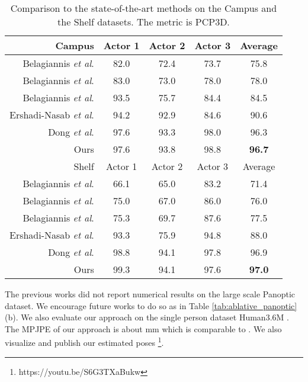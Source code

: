 \documentclass[runningheads]{llncs}
\def\etal{\emph{et al}. }
\begin{document}
\begin{table}[]
    \setlength{\tabcolsep}{10pt}
    \centering
    \begin{tabular}{r|cccc}
        \toprule
         Campus &  Actor 1 & Actor 2 & Actor 3 & Average \\
         \hline
         Belagiannis \etal \cite{belagiannis20143d} & 82.0 & 72.4 & 73.7 & 75.8\\
         Belagiannis \etal \cite{belagiannis2014multiple} & 83.0 & 73.0 & 78.0 & 78.0\\
         Belagiannis \etal \cite{belagiannis20153d} & 93.5 & 75.7 & 84.4 & 84.5\\
         Ershadi-Nasab \etal \cite{ershadi2018multiple} & 94.2 & 92.9 & 84.6 & 90.6\\
         Dong \etal \cite{dong2019fast} & 97.6 & 93.3 & 98.0 & 96.3\\
         Ours & 97.6 & 93.8 & 98.8 & \textbf{96.7} \\
         \hline
         \hline
          Shelf &  Actor 1 & Actor 2 & Actor 3 & Average \\
          \hline
          Belagiannis \etal \cite{belagiannis20143d} & 66.1 & 65.0 & 83.2 & 71.4\\
          Belagiannis \etal \cite{belagiannis2014multiple} & 75.0 & 67.0 & 86.0 & 76.0\\
          Belagiannis \etal \cite{belagiannis20153d} & 75.3 & 69.7 & 87.6 & 77.5\\
          Ershadi-Nasab \etal \cite{ershadi2018multiple} & 93.3 & 75.9 & 94.8 & 88.0\\
         Dong \etal \cite{dong2019fast} & 98.8 & 94.1 & 97.8 & 96.9\\
         Ours & 99.3 & 94.1 & 97.6 & \textbf{97.0}\\
         \bottomrule
    \end{tabular}
    \caption{Comparison to the state-of-the-art methods on the Campus and the Shelf datasets. The metric is PCP3D. }
    \label{tab:campus_and_shelf}
\end{table}

The previous works \cite{belagiannis20143d,belagiannis20153d,belagiannis2014multiple,dong2019fast} did not report numerical results on the large scale Panoptic dataset. We encourage future works to do so as in Table \ref{tab:ablative_panoptic} (b). We also evaluate our approach on the single person dataset Human3.6M \cite{ionescu2014human3}. The MPJPE of our approach is about mm which is comparable to \cite{iskakov2019learnable}. We also visualize and publish our estimated poses \footnote{https://youtu.be/S6G3TXaBukw}.
\end{document}
